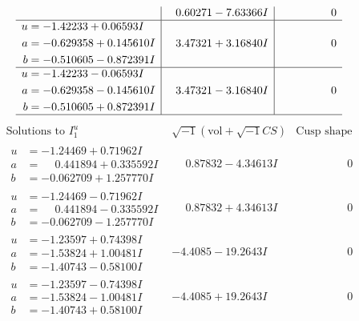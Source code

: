 \documentclass[1p]{elsarticle_modified}
\theoremstyle{definition}
\newcommand{\I}{\sqrt{-1}}
\begin{document}
$$\begin{array}{c|c|c}
 & \phantom{-}0.60271 - 7.63366 I & \phantom{-0.000000 } 0 \\ \hline\begin{aligned}
u &= -1.42233 + 0.06593 I \\
a &= -0.629358 + 0.145610 I \\
b &= -0.510605 - 0.872391 I\end{aligned}
 & \phantom{-}3.47321 + 3.16840 I & \phantom{-0.000000 } 0 \\ \hline\begin{aligned}
u &= -1.42233 - 0.06593 I \\
a &= -0.629358 - 0.145610 I \\
b &= -0.510605 + 0.872391 I\end{aligned}
 & \phantom{-}3.47321 - 3.16840 I & \phantom{-0.000000 } 0\\
 \hline 
 \end{array}$$\newpage$$\begin{array}{c|c|c}  
\text{Solutions to }I^u_{1}& \I (\text{vol} + \sqrt{-1}CS) & \text{Cusp shape}\\
 \hline 
\begin{aligned}
u &= -1.24469 + 0.71962 I \\
a &= \phantom{-}0.441894 + 0.335592 I \\
b &= -0.062709 + 1.257770 I\end{aligned}
 & \phantom{-}0.87832 - 4.34613 I & \phantom{-0.000000 } 0 \\ \hline\begin{aligned}
u &= -1.24469 - 0.71962 I \\
a &= \phantom{-}0.441894 - 0.335592 I \\
b &= -0.062709 - 1.257770 I\end{aligned}
 & \phantom{-}0.87832 + 4.34613 I & \phantom{-0.000000 } 0 \\ \hline\begin{aligned}
u &= -1.23597 + 0.74398 I \\
a &= -1.53824 + 1.00481 I \\
b &= -1.40743 - 0.58100 I\end{aligned}
 & -4.4085 - 19.2643 I & \phantom{-0.000000 } 0 \\ \hline\begin{aligned}
u &= -1.23597 - 0.74398 I \\
a &= -1.53824 - 1.00481 I \\
b &= -1.40743 + 0.58100 I\end{aligned}
 & -4.4085 + 19.2643 I & \phantom{-0.000000 } 0 \\ \hline\begin{aligned}

\end{aligned}
\end{array}$$
\end{document}
